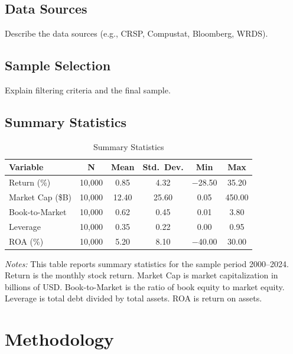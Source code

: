 \documentclass[12pt,a4paper]{article}
\begin{document}
\subsection{Data Sources}

Describe the data sources (e.g., CRSP, Compustat, Bloomberg, WRDS).

\subsection{Sample Selection}

Explain filtering criteria and the final sample.

\subsection{Summary Statistics}

\begin{table}[H]
\centering
\caption{Summary Statistics}
\label{tab:summary}
\begin{threeparttable}
\begin{tabular}{lccccc}
\toprule
Variable & N & Mean & Std.\ Dev. & Min & Max \\
\midrule
Return (\%)       & 10{,}000 & 0.85  & 4.32  & $-$28.50 & 35.20 \\
Market Cap (\$B)  & 10{,}000 & 12.40 & 25.60 & 0.05     & 450.00 \\
Book-to-Market    & 10{,}000 & 0.62  & 0.45  & 0.01     & 3.80 \\
Leverage          & 10{,}000 & 0.35  & 0.22  & 0.00     & 0.95 \\
ROA (\%)          & 10{,}000 & 5.20  & 8.10  & $-$40.00 & 30.00 \\
\bottomrule
\end{tabular}
\begin{tablenotes}
\small
\item \textit{Notes:} This table reports summary statistics for the sample period 2000--2024. Return is the monthly stock return. Market Cap is market capitalization in billions of USD. Book-to-Market is the ratio of book equity to market equity. Leverage is total debt divided by total assets. ROA is return on assets.
\end{tablenotes}
\end{threeparttable}
\end{table}

\section{Methodology}
\label{sec:methodology}
\end{document}

